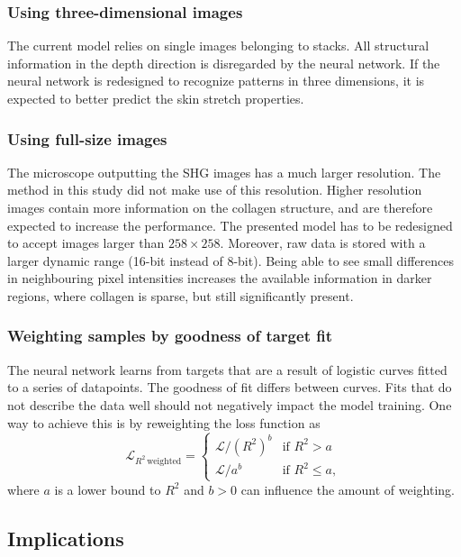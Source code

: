 \subsubsection{Using three-dimensional images}
The current model relies on single images belonging to stacks.
All structural information in the depth direction is disregarded by the neural network.
If the neural network is redesigned to recognize patterns in three dimensions, it is expected to better predict the skin stretch properties.

\subsubsection{Using full-size images}
The microscope outputting the SHG images has a much larger resolution.
The method in this study did not make use of this resolution.
Higher resolution images contain more information on the collagen structure, and are therefore expected to increase the performance.
The presented model has to be redesigned to accept images larger than $258\times258$.
Moreover, raw data is stored with a larger dynamic range (16-bit instead of 8-bit).
Being able to see small differences in neighbouring pixel intensities increases the available information \eg in darker regions, where collagen is sparse, but still significantly present.

\subsubsection{Weighting samples by goodness of target fit}
The neural network learns from targets that are a result of logistic curves fitted to a series of datapoints.
The goodness of fit differs between curves.
Fits that do not describe the data well should not negatively impact the model training.
One way to achieve this is by reweighting the loss function as
\begin{equation}
    \mathcal{L}_{R^2\,\mathrm{weighted}} =
    \begin{cases}
        \mathcal{L} / \left(R^2\right)^b & \text{if } R^2 > a     \\
        \mathcal{L} / a^b                & \text{if } R^2 \leq a,
    \end{cases}
\end{equation}
where $a$ is a lower bound to $R^2$ and $b > 0$ can influence the amount of weighting.

\subsection{Implications}
